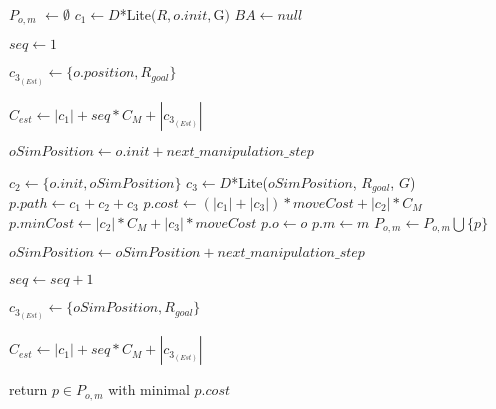 \begin{algorithm}[H]
  \begin{algorithmic}[1]


      \State $P_{o,m}$ $\gets \emptyset$
      \State $c_{1} \gets D$*Lite$(R, o.init, $G$)$
      \State $BA \gets null$


        \State $seq \gets 1$

        \State $c_{3_{(Est)}} \gets \{o.position, R_{goal}\}$

        \State $C_{est} \gets |c_{1}| + seq * C_{M} + |c_{3_{(Est)}}|$

        \State $oSimPosition \gets o.init + next\_manipulation\_step$


            \State $c_{2} \gets \{o.init, oSimPosition\}$
            \State $c_{3} \gets D$*Lite($oSimPosition$, $R_{goal}$, $G$)
            \State $p.path \gets c_{1} + c_{2} + c_{3}$
            \State $p.cost \gets (|c_{1}| + |c_{3}|) * moveCost + |c_{2}| * C_{M}$
            \State $p.minCost \gets |c_{2}| * C_{M} + |c_{3}| * moveCost$
            \State $p.o \gets o$
            \State $p.m \gets m$
            \State $P_{o,m} \gets P_{o,m} \bigcup \{p\}$
          \EndIf

          \State $oSimPosition \gets oSimPosition + next\_manipulation\_step$

          \State $seq \gets seq + 1$

          \State $c_{3_{(Est)}} \gets \{oSimPosition, R_{goal}\}$

          \State $C_{est} \gets |c_{1}| + seq * C_{M} + |c_{3_{(Est)}}|$

        \EndWhile

      \EndFor

    \State return $p \in P_{o,m}$ with minimal $p.cost$

    \EndProcedure

  \end{algorithmic}
\end{algorithm}
